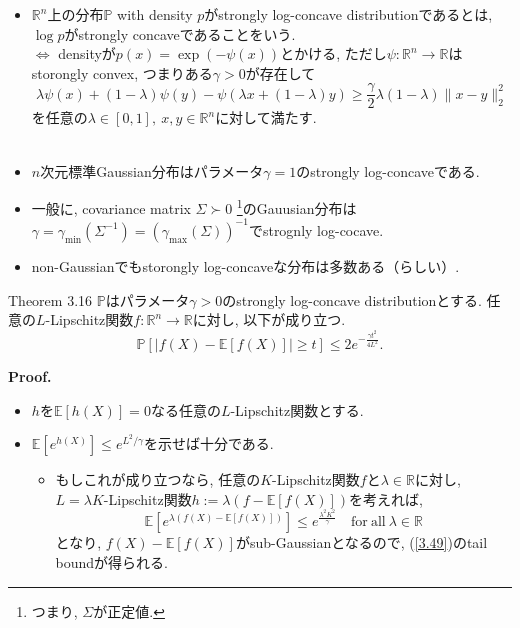 \documentclass[aspectratio=169, dvipdfmx]{beamer}
\newcommand{\ex}{\mathbb{E}}
\begin{document}
\begin{frame}
\begin{itemize}
    \item $\mathbb{R}^n$上の分布$\mathbb{P}$ with density $p$が{strongly log-concave distribution}であるとは,
    $\log p$がstrongly concaveであることをいう.\\
    $\Leftrightarrow$ densityが$p(x) = \exp(-\psi(x))$とかける,
    ただし$\psi:\mathbb{R}^n\to\mathbb{R}$はstorongly convex, つまりある$\gamma > 0$が存在して
    \[
        \lambda \psi(x)+(1-\lambda) \psi(y)-\psi(\lambda x+(1-\lambda) y)
        \geq \frac{\gamma}{2} \lambda(1-\lambda)\|x-y\|_{2}^{2}
        \tag{3.48}\label{3.48}
    \]
    を任意の$\lambda \in[0,1],\ x,y\in\mathbb{R}^n$に対して満たす.\\
    　
    \item $n$次元標準Gaussian分布はパラメータ$\gamma=1$のstrongly log-concaveである.
    \item 一般に, covariance matrix $\Sigma\succ 0$
    \footnote{つまり, $\Sigma$が正定値.}のGauusian分布は$\gamma = \gamma_{\min}(\Sigma^{-1})=(\gamma_{\max}(\Sigma))^{-1}$でstrognly log-cocave.
    \item non-Gaussianでもstorongly log-concaveな分布は多数ある（らしい）.
\end{itemize}
\end{frame}

\begin{frame}
\begin{block}{Theorem 3.16}
    $\mathbb{P}$はパラメータ$\gamma>0$のstrongly log-concave distributionとする.
    任意の$L$-Lipschitz関数$f:\mathbb{R}^n\to\mathbb{R}$に対し, 以下が成り立つ.
    \[
        \mathbb{P}[|f(X)-\mathbb{E}[f(X)]|
        \geq t] \leq 2 e^{-\frac{\gamma t^{2}}{4 L^{2}}}.
        \tag{3.49}\label{3.49}
    \]
\end{block}
{\bf Proof.}
\begin{itemize}
    \item $h$を$\ex[h(X)]=0$なる任意の$L$-Lipschitz関数とする.
    \item $\ex[e^{h(X)}]\le e^{L^2/\gamma}$を示せば十分である.
    \begin{itemize}
        \item もしこれが成り立つなら, 任意の$K$-Lipschitz関数$f$と$\lambda\in\mathbb{R}$に対し,
        $L=\lambda K$-Lipschitz関数$h:= \lambda(f - \ex[f(X)])$を考えれば,
        \[ \ex[e^{\lambda(f(X)-\ex[f(X)])}] \le e^{\frac{\lambda^2 K^2}{\gamma}}\quad\mathrm{for\ all}\ \lambda\in\mathbb{R} \]
        となり, $f(X)-\ex[f(X)]$がsub-Gaussianとなるので, (\ref{3.49})のtail boundが得られる.
    \end{itemize}
\end{itemize}
\end{frame}
\end{document}
